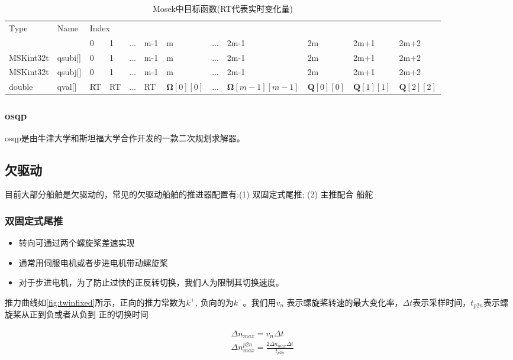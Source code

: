 \begin{table}[htbp]
  \caption{Mosek中目标函数(RT代表实时变化量)}
  \centering
  \begin{tabular}{@{}llllllllllll@{}}
  \toprule
  \multirow{2}{*}{Type} & \multirow{2}{*}{Name} & \multicolumn{10}{l}{Index}     \\ \cmidrule(l){3-12} 
                &  & 0  & 1  & ... & m-1 & m     & ... & 2m-1 & 2m & 2m+1 & 2m+2 \\ \cmidrule(r){1-2}
  MSKint32t   & qsubi{[}{]}    & 0  & 1  & ... & m-1 & m     & ... & 2m-1 & 2m & 2m+1 & 2m+2 \\
  MSKint32t   & qsubj{[}{]}    & 0  & 1  & ... & m-1 & m     & ... & 2m-1 & 2m & 2m+1 & 2m+2 \\
  double      & qval{[}{]}     & RT & RT & ... & RT  & $\bm{\Omega}[0][0]$ & ... &  $\bm{\Omega}[m-1][m-1]$    &  $\bm{Q}[0][0]$  &  $\bm{Q}[1][1]$  & $\bm{Q}[2][2]$  \\ 
  \bottomrule
  \end{tabular}
  \label{tab:mosekobjective}
\end{table}


\subsubsection{osqp}
osqp是由牛津大学和斯坦福大学合作开发的一款二次规划求解器。


\subsection{欠驱动}
目前大部分船舶是欠驱动的，常见的欠驱动船舶的推进器配置有:(1) 双固定式尾推; (2) 主推配合
船舵
\subsubsection{双固定式尾推}
\begin{itemize}
	\item 转向可通过两个螺旋桨差速实现
	\item 通常用伺服电机或者步进电机带动螺旋桨
	\item 对于步进电机，为了防止过快的正反转切换，我们人为限制其切换速度。
\end{itemize}

推力曲线如\ref{fig:twinfixed}所示，正向的推力常数为$k^+$, 负向的为$k^-$。我们用$v_n$
表示螺旋桨转速的最大变化率，$\Delta t$表示采样时间，$t_{p2n}$表示螺旋桨从正到负或者从负到
正的切换时间

\begin{equation}
  \begin{aligned}
    & \Delta n_{max} = v_n \Delta t \\
    & \Delta n_{max}^{p2n} = \frac{2 \Delta n_{max} \Delta t}{t_{p2n}}
  \end{aligned}
\end{equation}

